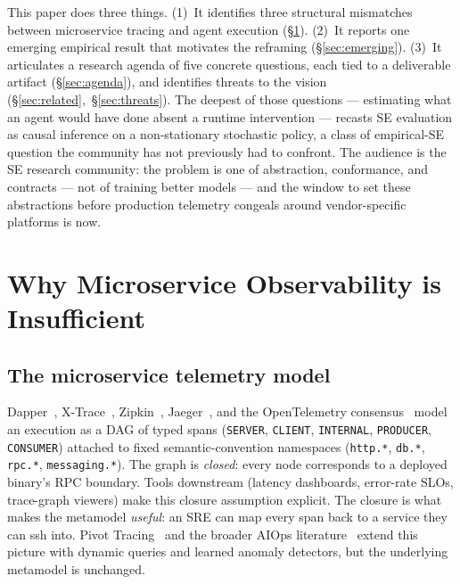 \documentclass[10pt,conference]{IEEEtran}
\begin{document}
This paper does three things. (1)~It identifies three structural
mismatches between microservice tracing and agent execution
(\S\ref{sec:mismatch}). (2)~It reports one emerging empirical result
that motivates the reframing (\S\ref{sec:emerging}). (3)~It articulates
a research agenda of five concrete questions, each tied to a
deliverable artifact (\S\ref{sec:agenda}), and identifies threats to
the vision (\S\ref{sec:related},~\S\ref{sec:threats}). The deepest of
those questions --- estimating what an agent would have done absent a
runtime intervention --- recasts SE evaluation as causal inference on a
non-stationary stochastic policy, a class of empirical-SE question the
community has not previously had to confront. The audience is the SE
research community: the problem is one of abstraction, conformance, and
contracts --- not of training better models --- and the window to set
these abstractions before production telemetry congeals around
vendor-specific platforms is now.

\section{Why Microservice Observability is Insufficient}
\label{sec:mismatch}

\subsection{The microservice telemetry model}

Dapper~\cite{dapper}, X-Trace~\cite{xtrace}, Zipkin~\cite{zipkin},
Jaeger~\cite{jaeger}, and the OpenTelemetry consensus~\cite{otel_spec}
model an execution as a DAG of typed spans
(\texttt{SERVER}, \texttt{CLIENT}, \texttt{INTERNAL},
\texttt{PRODUCER}, \texttt{CONSUMER}) attached to fixed
semantic-convention namespaces (\texttt{http.*}, \texttt{db.*},
\texttt{rpc.*}, \texttt{messaging.*}). The graph is \emph{closed}: every
node corresponds to a deployed binary's RPC boundary. Tools downstream
(latency dashboards, error-rate SLOs, trace-graph viewers) make this
closure assumption explicit. The closure is what makes
the metamodel \emph{useful}: an SRE can map every span back to a service
they can ssh into. Pivot Tracing~\cite{datadog_aps} and the broader
AIOps literature~\cite{aiops_survey,nersession} extend this picture
with dynamic queries and learned anomaly detectors, but the underlying
metamodel is unchanged.
\end{document}
